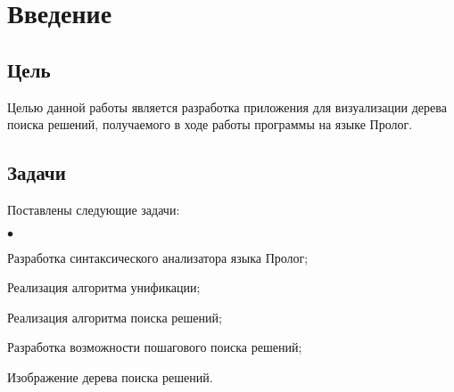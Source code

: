 \chapter{Введение}
\section{Цель}
Целью данной работы является разработка приложения для визуализации дерева поиска решений, получаемого в ходе работы программы на языке Пролог.
\section{Задачи}
Поставлены следующие задачи:
\begin{list}{$\bullet$}{}
	\item Разработка синтаксического анализатора языка Пролог;
	\item Реализация алгоритма унификации;
	\item Реализация алгоритма поиска решений;
	\item Разработка возможности пошагового поиска решений;
	\item Изображение дерева поиска решений.
\end{list}
